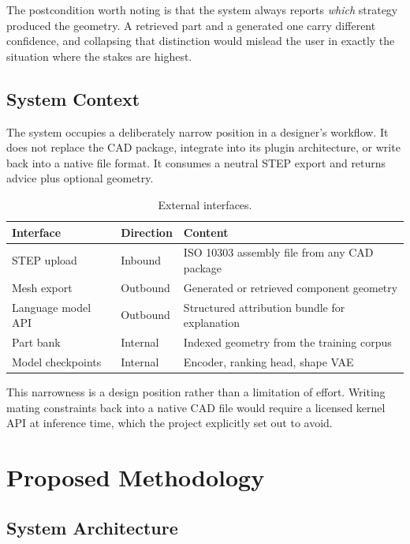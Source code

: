 \documentclass[12pt,oneside,a4paper]{report}
\begin{document}
The postcondition worth noting is that the system always reports \emph{which}
strategy produced the geometry. A retrieved part and a generated one carry
different confidence, and collapsing that distinction would mislead the user
in exactly the situation where the stakes are highest.

\section{System Context}

The system occupies a deliberately narrow position in a designer's workflow. It
does not replace the CAD package, integrate into its plugin architecture, or
write back into a native file format. It consumes a neutral STEP export and
returns advice plus optional geometry.

\begin{table}[h]
\centering
\caption{External interfaces.}
\label{tab:interfaces}
\small
\begin{tabularx}{\textwidth}{@{}L{3.4cm}L{3.0cm}X@{}}
\toprule
\textbf{Interface} & \textbf{Direction} & \textbf{Content} \\
\midrule
STEP upload & Inbound & ISO 10303 assembly file from any CAD package \\
Mesh export & Outbound & Generated or retrieved component geometry \\
Language model API & Outbound & Structured attribution bundle for explanation \\
Part bank & Internal & Indexed geometry from the training corpus \\
Model checkpoints & Internal & Encoder, ranking head, shape VAE \\
\bottomrule
\end{tabularx}
\end{table}

This narrowness is a design position rather than a limitation of effort.
Writing mating constraints back into a native CAD file would require a licensed
kernel API at inference time, which the project explicitly set out to avoid.

\chapter{Proposed Methodology}

\section{System Architecture}
\end{document}

